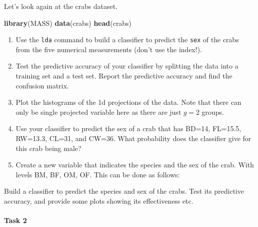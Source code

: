 \documentclass[
]{book}
\newenvironment{Shaded}{\begin{snugshade}}{\end{snugshade}}
\newcommand{\AttributeTok}[1]{\textcolor[rgb]{0.13,0.29,0.53}{#1}}
\newcommand{\FunctionTok}[1]{\textcolor[rgb]{0.13,0.29,0.53}{\textbf{#1}}}
\newcommand{\NormalTok}[1]{#1}
\newcommand{\OtherTok}[1]{\textcolor[rgb]{0.56,0.35,0.01}{#1}}
\newcommand{\SpecialCharTok}[1]{\textcolor[rgb]{0.81,0.36,0.00}{\textbf{#1}}}
\newcommand{\StringTok}[1]{\textcolor[rgb]{0.31,0.60,0.02}{#1}}
\theoremstyle{definition}
\theoremstyle{definition}
\theoremstyle{definition}
\theoremstyle{definition}
\theoremstyle{remark}
\begin{document}
Let's look again at the crabs dataset.

\begin{Shaded}
\begin{Highlighting}[]
\FunctionTok{library}\NormalTok{(MASS)}
\FunctionTok{data}\NormalTok{(crabs)}
\FunctionTok{head}\NormalTok{(crabs)}
\end{Highlighting}
\end{Shaded}

\begin{enumerate}
\def\labelenumi{\roman{enumi}.}
\item
  Use the \texttt{lda} command to build a classifier to predict the \texttt{sex} of the crabs from the
  five numerical measurements (don't use the index!).
\item
  Test the predictive accuracy of your classifier by splitting the data into a training set and a test set. Report the predictive accuracy and find the confusion matrix.
\item
  Plot the histograms of the 1d projections of the data. Note that there can only be single projected variable here as there are just \(g=2\) groups.
\item
  Use your classifier to predict the sex of a crab that has BD=14, FL=15.5, RW=13.3, CL=31, and CW=36. What probability does the classifier give for this crab being male?
\item
  Create a new variable that indicates the species and the sex of the crab. With levels
  BM, BF, OM, OF. This can be done as follows:
\end{enumerate}

\begin{Shaded}
\end{Shaded}

Build a classifier to predict the species and sex of the crabs. Test its predictive accuracy, and provide some plots showing its effectiveness etc.

\hypertarget{task-2-3}{%
\paragraph*{Task 2}\label{task-2-3}}
\end{document}
